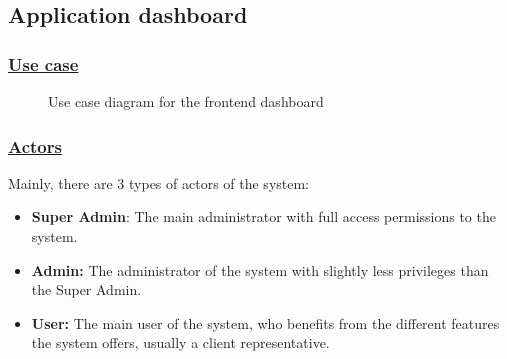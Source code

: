 \subsection{Application dashboard}

\subsubsection*{\underline{Use case}}
\begin{figure}[H]
	\centering
	\caption{Use case diagram for the frontend dashboard}
	\label{fig:use-case-diagram}
\end{figure}

\subsubsection*{\underline{Actors}}
Mainly, there are 3 types of actors of the system:
\begin{itemize}
	\item \textbf{Super Admin}: The main administrator with full access permissions to the system.
	\item \textbf{Admin:} The administrator of the system with slightly less privileges than the Super Admin.
	\item \textbf{User:} The main user of the system, who benefits from the different features the system offers, usually a client representative.
\end{itemize}

